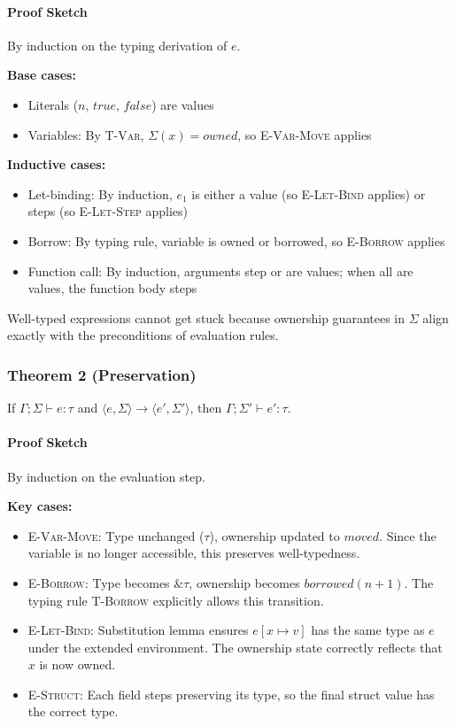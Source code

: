 \documentclass[11pt,a4paper,twoside]{book}
\begin{document}
\paragraph{Proof Sketch}
By induction on the typing derivation of $e$.

\textbf{Base cases:}
\begin{itemize}
  \item Literals ($n$, $true$, $false$) are values
  \item Variables: By \textsc{T-Var}, $\Sigma(x) = owned$, so \textsc{E-Var-Move}
    applies
\end{itemize}

\textbf{Inductive cases:}
\begin{itemize}
  \item Let-binding: By induction, $e_1$ is either a value (so \textsc{E-Let-Bind}
    applies) or steps (so \textsc{E-Let-Step} applies)
  \item Borrow: By typing rule, variable is owned or borrowed, so
    \textsc{E-Borrow} applies
  \item Function call: By induction, arguments step or are values; when all are
    values, the function body steps
\end{itemize}

Well-typed expressions cannot get stuck because ownership guarantees in $\Sigma$
align exactly with the preconditions of evaluation rules.


\subsubsection{Theorem 2 (Preservation)}

If $\Gamma ; \Sigma \vdash e : \tau$ and
$\langle e, \Sigma \rangle \rightarrow \langle e', \Sigma' \rangle$,
then $\Gamma ; \Sigma' \vdash e' : \tau$.

\paragraph{Proof Sketch}
By induction on the evaluation step.

\textbf{Key cases:}
\begin{itemize}
  \item \textsc{E-Var-Move}: Type unchanged ($\tau$), ownership updated to
    $moved$. Since the variable is no longer accessible, this preserves
    well-typedness.
  \item \textsc{E-Borrow}: Type becomes $\&\tau$, ownership becomes
    $borrowed(n+1)$. The typing rule \textsc{T-Borrow} explicitly allows this
    transition.
  \item \textsc{E-Let-Bind}: Substitution lemma ensures $e[x \mapsto v]$ has the
    same type as $e$ under the extended environment. The ownership state correctly
    reflects that $x$ is now owned.
  \item \textsc{E-Struct}: Each field steps preserving its type, so the final
    struct value has the correct type.
\end{itemize}
\end{document}
